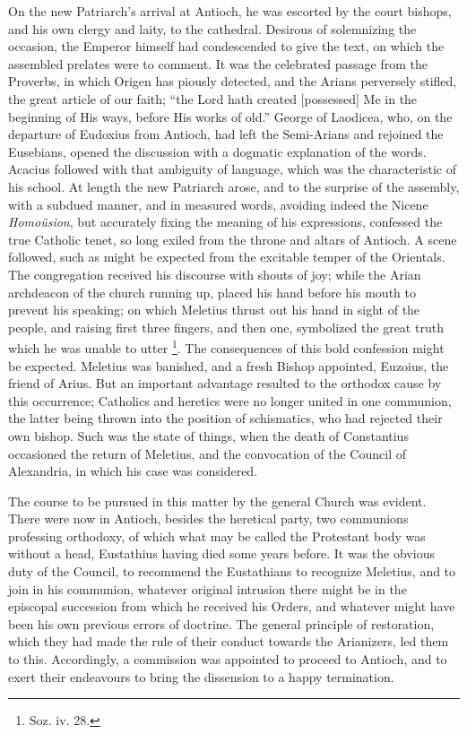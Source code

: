 On the new Patriarch's arrival at Antioch, he was escorted by the
court bishops, and his own clergy and laity, to the cathedral.
Desirous of solemnizing the occasion, the Emperor himself had
condescended to give the text, on which the assembled prelates were to
comment. It was the celebrated passage from the Proverbs, in which
Origen has piously detected, and the Arians perversely stifled, the
great article of our faith; ``the Lord hath created [possessed] Me
in the beginning of His ways, before His works of old.'' George of
Laodicea, who, on the departure of Eudoxius from Antioch, had left the
Semi-Arians and rejoined the Eusebians, opened the discussion with a
dogmatic explanation of the words. Acacius followed with that
ambiguity of language, which was the characteristic of his school. At
length the new Patriarch arose, and to the surprise of the assembly,
with a subdued manner, and in measured words, avoiding indeed the
Nicene \emph{Homoüsion}, but accurately fixing the meaning of his
expressions, confessed the true Catholic tenet, so long exiled from
the throne and altars of Antioch. A scene followed, such as might be
expected from the excitable temper of the Orientals. The congregation
received his discourse with shouts of joy; while the Arian archdeacon
of the church running up, placed his hand before his mouth to prevent
his speaking; on which Meletius thrust out his hand in sight of the
people, and raising first three fingers, and then one,
symbolized the great truth which he was unable to utter \footnote{Soz. iv. 28.}. The consequences of this bold confession might be expected.
Meletius was banished, and a fresh Bishop appointed, Euzoius, the
friend of Arius. But an important advantage resulted to the orthodox
cause by this occurrence; Catholics and heretics were no longer united
in one communion, the latter being thrown into the position of
schismatics, who had rejected their own bishop. Such was the state of
things, when the death of Constantius occasioned the return of
Meletius, and the convocation of the Council of Alexandria, in which
his case was considered.

The course to be pursued in this matter by the general Church was
evident. There were now in Antioch, besides the heretical party, two
communions professing orthodoxy, of which what may be called the
Protestant body was without a head, Eustathius having died some years
before. It was the obvious duty of the Council, to recommend the
Eustathians to recognize Meletius, and to join in his communion,
whatever original intrusion there might be in the episcopal succession
from which he received his Orders, and whatever might have been his
own previous errors of doctrine. The general principle of restoration,
which they had made the rule of their conduct towards the Arianizers,
led them to this. Accordingly, a commission was appointed to proceed
to Antioch, and to exert their endeavours to bring the dissension to a
happy termination.

